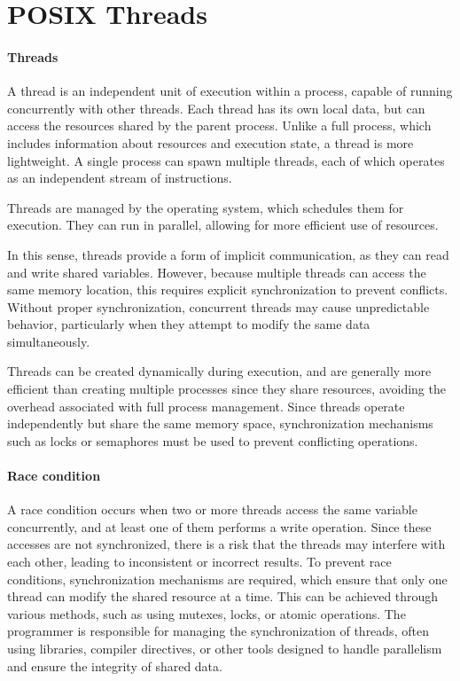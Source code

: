 \section{POSIX Threads}

\paragraph*{Threads}
A thread is an independent unit of execution within a process, capable of running concurrently with other threads. 
Each thread has its own local data, but can access the resources shared by the parent process. 
Unlike a full process, which includes information about resources and execution state, a thread is more lightweight. 
A single process can spawn multiple threads, each of which operates as an independent stream of instructions.

Threads are managed by the operating system, which schedules them for execution. 
They can run in parallel, allowing for more efficient use of resources. 

In this sense, threads provide a form of implicit communication, as they can read and write shared variables. 
However, because multiple threads can access the same memory location, this requires explicit synchronization to prevent conflicts. 
Without proper synchronization, concurrent threads may cause unpredictable behavior, particularly when they attempt to modify the same data simultaneously.

Threads can be created dynamically during execution, and are generally more efficient than creating multiple processes since they share resources, avoiding the overhead associated with full process management. 
Since threads operate independently but share the same memory space, synchronization mechanisms such as locks or semaphores must be used to prevent conflicting operations.

\paragraph*{Race condition}
A race condition occurs when two or more threads access the same variable concurrently, and at least one of them performs a write operation. 
Since these accesses are not synchronized, there is a risk that the threads may interfere with each other, leading to inconsistent or incorrect results. 
To prevent race conditions, synchronization mechanisms are required, which ensure that only one thread can modify the shared resource at a time.
This can be achieved through various methods, such as using mutexes, locks, or atomic operations. 
The programmer is responsible for managing the synchronization of threads, often using libraries, compiler directives, or other tools designed to handle parallelism and ensure the integrity of shared data.

